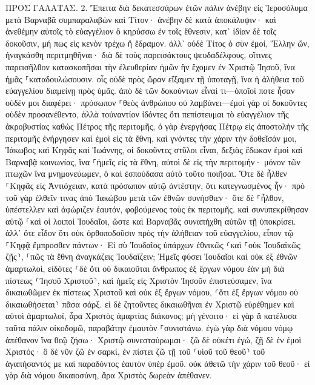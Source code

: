 \documentclass[twoside, 9pt]{extreport}
\begin{document}
ΠΡΟΣ ΓΑΛΑΤΑΣ.
2.
Ἔπειτα διὰ δεκατεσσάρων ἐτῶν πάλιν ἀνέβην εἰς Ἱεροσόλυμα μετὰ Βαρναβᾶ συμπαραλαβὼν καὶ Τίτον· 
ἀνέβην δὲ κατὰ ἀποκάλυψιν· καὶ ἀνεθέμην αὐτοῖς τὸ εὐαγγέλιον ὃ κηρύσσω ἐν τοῖς ἔθνεσιν, κατ᾽ ἰδίαν δὲ τοῖς δοκοῦσιν, μή πως εἰς κενὸν τρέχω ἢ ἔδραμον. 
ἀλλ᾽ οὐδὲ Τίτος ὁ σὺν ἐμοί, Ἕλλην ὤν, ἠναγκάσθη περιτμηθῆναι· 
διὰ δὲ τοὺς παρεισάκτους ψευδαδέλφους, οἵτινες παρεισῆλθον κατασκοπῆσαι τὴν ἐλευθερίαν ἡμῶν ἣν ἔχομεν ἐν Χριστῷ Ἰησοῦ, ἵνα ἡμᾶς ⸀καταδουλώσουσιν. 
οἷς οὐδὲ πρὸς ὥραν εἴξαμεν τῇ ὑποταγῇ, ἵνα ἡ ἀλήθεια τοῦ εὐαγγελίου διαμείνῃ πρὸς ὑμᾶς. 
ἀπὸ δὲ τῶν δοκούντων εἶναί τι—ὁποῖοί ποτε ἦσαν οὐδέν μοι διαφέρει· πρόσωπον ⸀θεὸς ἀνθρώπου οὐ λαμβάνει—ἐμοὶ γὰρ οἱ δοκοῦντες οὐδὲν προσανέθεντο, 
ἀλλὰ τοὐναντίον ἰδόντες ὅτι πεπίστευμαι τὸ εὐαγγέλιον τῆς ἀκροβυστίας καθὼς Πέτρος τῆς περιτομῆς, 
ὁ γὰρ ἐνεργήσας Πέτρῳ εἰς ἀποστολὴν τῆς περιτομῆς ἐνήργησεν καὶ ἐμοὶ εἰς τὰ ἔθνη, 
καὶ γνόντες τὴν χάριν τὴν δοθεῖσάν μοι, Ἰάκωβος καὶ Κηφᾶς καὶ Ἰωάννης, οἱ δοκοῦντες στῦλοι εἶναι, δεξιὰς ἔδωκαν ἐμοὶ καὶ Βαρναβᾷ κοινωνίας, ἵνα ⸀ἡμεῖς εἰς τὰ ἔθνη, αὐτοὶ δὲ εἰς τὴν περιτομήν· 
μόνον τῶν πτωχῶν ἵνα μνημονεύωμεν, ὃ καὶ ἐσπούδασα αὐτὸ τοῦτο ποιῆσαι. 
Ὅτε δὲ ἦλθεν ⸀Κηφᾶς εἰς Ἀντιόχειαν, κατὰ πρόσωπον αὐτῷ ἀντέστην, ὅτι κατεγνωσμένος ἦν· 
πρὸ τοῦ γὰρ ἐλθεῖν τινας ἀπὸ Ἰακώβου μετὰ τῶν ἐθνῶν συνήσθιεν· ὅτε δὲ ⸀ἦλθον, ὑπέστελλεν καὶ ἀφώριζεν ἑαυτόν, φοβούμενος τοὺς ἐκ περιτομῆς. 
καὶ συνυπεκρίθησαν αὐτῷ ⸀καὶ οἱ λοιποὶ Ἰουδαῖοι, ὥστε καὶ Βαρναβᾶς συναπήχθη αὐτῶν τῇ ὑποκρίσει. 
ἀλλ᾽ ὅτε εἶδον ὅτι οὐκ ὀρθοποδοῦσιν πρὸς τὴν ἀλήθειαν τοῦ εὐαγγελίου, εἶπον τῷ ⸀Κηφᾷ ἔμπροσθεν πάντων· Εἰ σὺ Ἰουδαῖος ὑπάρχων ἐθνικῶς ⸂καὶ ⸀οὐκ Ἰουδαϊκῶς ζῇς⸃, ⸀πῶς τὰ ἔθνη ἀναγκάζεις Ἰουδαΐζειν; 
Ἡμεῖς φύσει Ἰουδαῖοι καὶ οὐκ ἐξ ἐθνῶν ἁμαρτωλοί, 
εἰδότες ⸀δὲ ὅτι οὐ δικαιοῦται ἄνθρωπος ἐξ ἔργων νόμου ἐὰν μὴ διὰ πίστεως ⸂Ἰησοῦ Χριστοῦ⸃, καὶ ἡμεῖς εἰς Χριστὸν Ἰησοῦν ἐπιστεύσαμεν, ἵνα δικαιωθῶμεν ἐκ πίστεως Χριστοῦ καὶ οὐκ ἐξ ἔργων νόμου, ⸂ὅτι ἐξ ἔργων νόμου οὐ δικαιωθήσεται⸃ πᾶσα σάρξ. 
εἰ δὲ ζητοῦντες δικαιωθῆναι ἐν Χριστῷ εὑρέθημεν καὶ αὐτοὶ ἁμαρτωλοί, ἆρα Χριστὸς ἁμαρτίας διάκονος; μὴ γένοιτο· 
εἰ γὰρ ἃ κατέλυσα ταῦτα πάλιν οἰκοδομῶ, παραβάτην ἐμαυτὸν ⸀συνιστάνω. 
ἐγὼ γὰρ διὰ νόμου νόμῳ ἀπέθανον ἵνα θεῷ ζήσω· Χριστῷ συνεσταύρωμαι· 
ζῶ δὲ οὐκέτι ἐγώ, ζῇ δὲ ἐν ἐμοὶ Χριστός· ὃ δὲ νῦν ζῶ ἐν σαρκί, ἐν πίστει ζῶ τῇ τοῦ ⸂υἱοῦ τοῦ θεοῦ⸃ τοῦ ἀγαπήσαντός με καὶ παραδόντος ἑαυτὸν ὑπὲρ ἐμοῦ. 
οὐκ ἀθετῶ τὴν χάριν τοῦ θεοῦ· εἰ γὰρ διὰ νόμου δικαιοσύνη, ἄρα Χριστὸς δωρεὰν ἀπέθανεν. 
\end{document}
